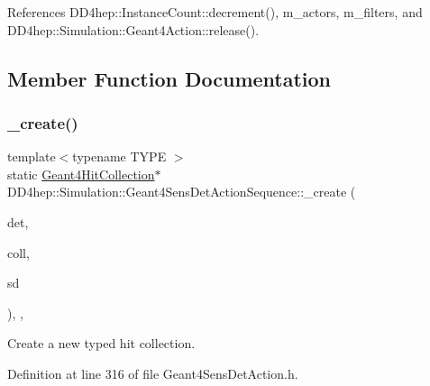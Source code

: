 References D\+D4hep\+::\+Instance\+Count\+::decrement(), m\+\_\+actors, m\+\_\+filters, and D\+D4hep\+::\+Simulation\+::\+Geant4\+Action\+::release().



\subsection{Member Function Documentation}
\hypertarget{class_d_d4hep_1_1_simulation_1_1_geant4_sens_det_action_sequence_a56f76d9b03d5610cbcccc0468d519c1d}{}\label{class_d_d4hep_1_1_simulation_1_1_geant4_sens_det_action_sequence_a56f76d9b03d5610cbcccc0468d519c1d} 
\subsubsection{\texorpdfstring{\+\_\+create()}{\_create()}}
{\footnotesize\ttfamily template$<$typename T\+Y\+PE $>$ \\
static \hyperlink{class_d_d4hep_1_1_simulation_1_1_geant4_hit_collection}{Geant4\+Hit\+Collection}$\ast$ D\+D4hep\+::\+Simulation\+::\+Geant4\+Sens\+Det\+Action\+Sequence\+::\+\_\+create (\begin{DoxyParamCaption}\item[{const std\+::string \&}]{det,  }\item[{const std\+::string \&}]{coll,  }\item[{\hyperlink{class_d_d4hep_1_1_simulation_1_1_geant4_sensitive}{Geant4\+Sensitive} $\ast$}]{sd }\end{DoxyParamCaption})\hspace{0.3cm}{\ttfamily [inline]}, {\ttfamily [static]}, {\ttfamily [protected]}}



Create a new typed hit collection. 



Definition at line 316 of file Geant4\+Sens\+Det\+Action.\+h.

\hypertarget{class_d_d4hep_1_1_simulation_1_1_geant4_sens_det_action_sequence_aa3af85c443979428311f932af57473fd}{}\label{class_d_d4hep_1_1_simulation_1_1_geant4_sens_det_action_sequence_aa3af85c443979428311f932af57473fd} 
